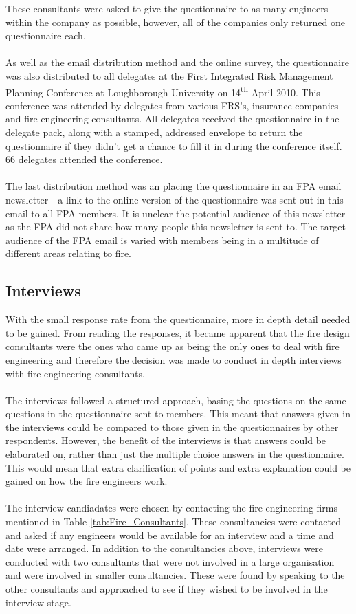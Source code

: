 \documentclass[table,a4paper,oneside]{book}
\begin{document}
These consultants were asked to give the questionnaire to as many engineers within the company as possible, however, all of the companies only returned one questionnaire each.
\\
\\
As well as the email distribution method and the online survey, the questionnaire was also distributed to all delegates at the First Integrated Risk Management Planning Conference at Loughborough University on 14\textsuperscript{th} April 2010. This conference was attended by delegates from various \ac{FRS}'s, insurance companies and fire engineering consultants. All delegates received the questionnaire in the delegate pack, along with a stamped, addressed envelope to return the questionnaire if they didn't get a chance to fill it in during the conference itself. 66 delegates attended the conference.
\\
\\
The last distribution method was an placing the questionnaire in an \ac{FPA} email newsletter - a link to the online version of the questionnaire was sent out in this email to all \ac{FPA} members. It is unclear the potential audience of this newsletter as the \ac{FPA} did not share how many people this newsletter is sent to. The target audience of the \ac{FPA} email is varied with members being in a multitude of different areas relating to fire.

\subsection{Interviews}
\label{sec:Interviews}
With the small response rate from the questionnaire, more in depth detail needed to be gained. From reading the responses, it became apparent that the fire design consultants were the ones who came up as being the only ones to deal with fire engineering and therefore the decision was made to conduct in depth interviews with fire engineering consultants.
\\
\\
The interviews followed a structured approach, basing the questions on the same questions in the questionnaire sent to members. This meant that answers given in the interviews could be compared to those given in the questionnaires by other respondents. However, the benefit of the interviews is that answers could be elaborated on, rather than just the multiple choice answers in the questionnaire. This would mean that extra clarification of points and extra explanation could be gained on how the fire engineers work.
\\
\\
The interview candiadates were chosen by contacting the fire engineering firms mentioned in Table \ref{tab:Fire_Consultants}. These consultancies were contacted and asked if any engineers would be available for an interview and a time and date were arranged. In addition to the consultancies above, interviews were conducted with two consultants that were not involved in a large organisation and were involved in smaller consultancies. These were found by speaking to the other consultants and approached to see if they wished to be involved in the interview stage.
\end{document}
